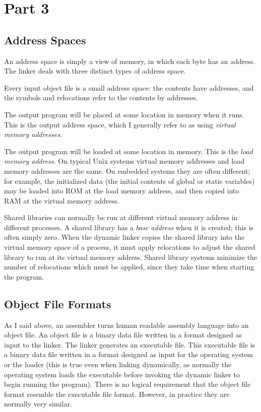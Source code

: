 \section{Part 3}
\subsection{Address Spaces}

An address space is simply a view of memory, in which each byte has an
address. The linker deals with three distinct types of address space.

Every input object file is a small address space: the contents have
addresses, and the symbols and relocations refer to the contents by
addresses.

The output program will be placed at some location in memory when it
runs. This is the output address space, which I generally refer to as
using \emph{virtual memory addresses}.

The output program will be loaded at some location in memory. This is
the \emph{load memory address}. On typical Unix systems virtual memory
addresses and load memory addresses are the same. On embedded systems
they are often different; for example, the initialized data (the initial
contents of global or static variables) may be loaded into ROM at the
load memory address, and then copied into RAM at the virtual memory
address.

Shared libraries can normally be run at different virtual memory address
in different processes. A shared library has a \emph{base address}
when it is created; this is often simply zero. When the dynamic linker
copies the shared library into the virtual memory space of a process,
it must apply relocations to adjust the shared library to run at its
virtual memory address. Shared library systems minimize the number of
relocations which must be applied, since they take time when starting
the program.

\subsection{Object File Formats}

As I said above, an assembler turns human readable assembly language
into an object file. An object file is a binary data file written in
a format designed as input to the linker. The linker generates an
executable file. This executable file is a binary data file written in
a format designed as input for the operating system or the loader (this
is true even when linking dynamically, as normally the operating system
loads the executable before invoking the dynamic linker to begin running
the program). There is no logical requirement that the object file
format resemble the executable file format. However, in practice they
are normally very similar.

